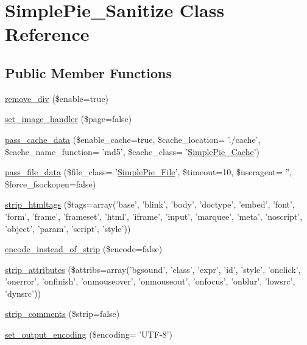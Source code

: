 \hypertarget{class_simple_pie___sanitize}{\section{Simple\-Pie\-\_\-\-Sanitize Class Reference}
\label{class_simple_pie___sanitize}
}
\subsection*{Public Member Functions}
\begin{DoxyCompactItemize}
\item 
\hyperlink{class_simple_pie___sanitize_a4b7409304969ebb875bb840ec3b8fe80}{remove\-\_\-div} (\$enable=true)
\item 
\hyperlink{class_simple_pie___sanitize_a2582d9202354037970d8296b6f46deb9}{set\-\_\-image\-\_\-handler} (\$page=false)
\item 
\hyperlink{class_simple_pie___sanitize_a0cc212ba61d17cecf01dc8cb3a2823b7}{pass\-\_\-cache\-\_\-data} (\$enable\-\_\-cache=true, \$cache\-\_\-location= './cache', \$cache\-\_\-name\-\_\-function= 'md5', \$cache\-\_\-class= '\hyperlink{class_simple_pie___cache}{Simple\-Pie\-\_\-\-Cache}')
\item 
\hyperlink{class_simple_pie___sanitize_ab896fd780b35b9ddbdbe245ed8464916}{pass\-\_\-file\-\_\-data} (\$file\-\_\-class= '\hyperlink{class_simple_pie___file}{Simple\-Pie\-\_\-\-File}', \$timeout=10, \$useragent= '', \$force\-\_\-fsockopen=false)
\item 
\hyperlink{class_simple_pie___sanitize_a9ca34ae1d422b188c4afa98d95d7c158}{strip\-\_\-htmltags} (\$tags=array('base', 'blink', 'body', 'doctype', 'embed', 'font', 'form', 'frame', 'frameset', 'html', 'iframe', 'input', 'marquee', 'meta', 'noscript', 'object', 'param', 'script', 'style'))
\item 
\hyperlink{class_simple_pie___sanitize_a6f64f6b9b43bd2b8a8ec567fa9aa9ff8}{encode\-\_\-instead\-\_\-of\-\_\-strip} (\$encode=false)
\item 
\hyperlink{class_simple_pie___sanitize_a487a5fc8b6154e4570ad389242cc99b6}{strip\-\_\-attributes} (\$attribs=array('bgsound', 'class', 'expr', 'id', 'style', 'onclick', 'onerror', 'onfinish', 'onmouseover', 'onmouseout', 'onfocus', 'onblur', 'lowsrc', 'dynsrc'))
\item 
\hyperlink{class_simple_pie___sanitize_a5c34418dedd5260088c91628f0acd82c}{strip\-\_\-comments} (\$strip=false)
\item 
\hyperlink{class_simple_pie___sanitize_a14b36f76785747e174564610a8e2fb06}{set\-\_\-output\-\_\-encoding} (\$encoding= 'U\-T\-F-\/8')

\end{DoxyCompactItemize}
